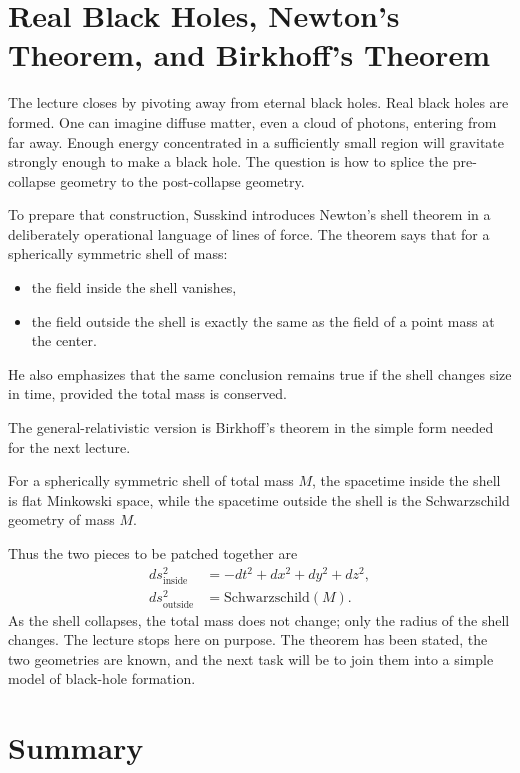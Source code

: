 \section{Real Black Holes, Newton's Theorem, and Birkhoff's Theorem}

The lecture closes by pivoting away from eternal black holes. Real black holes are formed. One can imagine diffuse matter, even a cloud of photons, entering from far away. Enough energy concentrated in a sufficiently small region will gravitate strongly enough to make a black hole. The question is how to splice the pre-collapse geometry to the post-collapse geometry.

To prepare that construction, Susskind introduces Newton's shell theorem in a deliberately operational language of lines of force. The theorem says that for a spherically symmetric shell of mass:
\begin{itemize}
\item the field inside the shell vanishes,
\item the field outside the shell is exactly the same as the field of a point mass at the center.
\end{itemize}
He also emphasizes that the same conclusion remains true if the shell changes size in time, provided the total mass is conserved.

The general-relativistic version is Birkhoff's theorem in the simple form needed for the next lecture.

\begin{theorem}
For a spherically symmetric shell of total mass \(M\), the spacetime inside the shell is flat Minkowski space, while the spacetime outside the shell is the Schwarzschild geometry of mass \(M\).
\end{theorem}

Thus the two pieces to be patched together are
\begin{align}
ds^2_{\text{inside}} &= -dt^2 + dx^2 + dy^2 + dz^2,\\
ds^2_{\text{outside}} &= \text{Schwarzschild}(M).
\end{align}
As the shell collapses, the total mass does not change; only the radius of the shell changes. The lecture stops here on purpose. The theorem has been stated, the two geometries are known, and the next task will be to join them into a simple model of black-hole formation.

\section{Summary}

